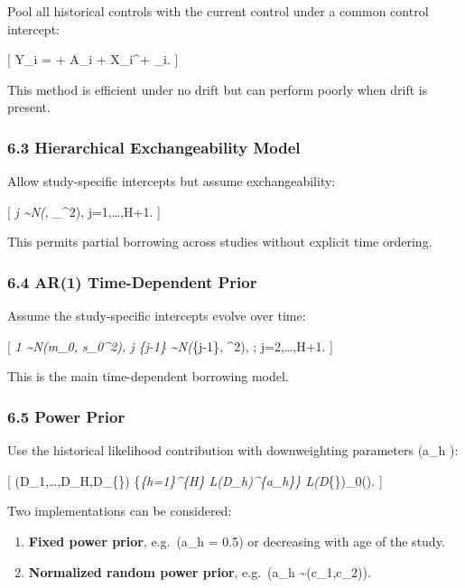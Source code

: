 \documentclass[
  letterpaper,
  DIV=11,
  numbers=noendperiod]{scrartcl}
\providecommand{\tightlist}{%
  \setlength{\itemsep}{0pt}\setlength{\parskip}{0pt}}
\begin{document}
Pool all historical controls with the current control under a common
control intercept:

{[} Y\_i = \alpha + \tau A\_i + X\_i\^{}\top \beta + \varepsilon\_i. {]}

This method is efficient under no drift but can perform poorly when
drift is present.

\subsubsection{6.3 Hierarchical Exchangeability
Model}\label{hierarchical-exchangeability-model}

Allow study-specific intercepts but assume exchangeability:

{[} \alpha\emph{j \sim N(\mu}\alpha, \tau\_\alpha\^{}2),
\qquad j=1,\dots,H+1. {]}

This permits partial borrowing across studies without explicit time
ordering.

\subsubsection{6.4 AR(1) Time-Dependent
Prior}\label{ar1-time-dependent-prior}

Assume the study-specific intercepts evolve over time:

{[} \alpha\emph{1 \sim N(m\_0, s\_0\^{}2), \qquad \alpha\emph{j
\mid \alpha}\{j-1\} \sim N(\phi \alpha}\{j-1\}, \omega\^{}2), ;
j=2,\dots,H+1. {]}

This is the main time-dependent borrowing model.

\subsubsection{6.5 Power Prior}\label{power-prior}

Use the historical likelihood contribution with downweighting parameters
(a\_h \in [0,1]):

{[} \pi(\Theta \mid D\_1,\dots,D\_H,D\_\{\}) \propto
\left\{\prod\emph{\{h=1\}\^{}\{H\}
L(\Theta \mid D\_h)\^{}\{a\_h\}\right\}
L(\Theta \mid D}\{\})\pi\_0(\Theta). {]}

Two implementations can be considered:

\begin{enumerate}
\def\labelenumi{\arabic{enumi}.}
\tightlist
\item
  \textbf{Fixed power prior}, e.g.~(a\_h = 0.5) or decreasing with age
  of the study.
\item
  \textbf{Normalized random power prior}, e.g.~(a\_h
  \sim {}(c\_1,c\_2)).
\end{enumerate}
\end{document}
